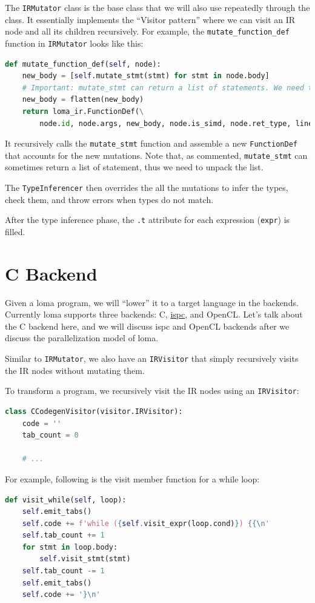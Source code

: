 The \lstinline{IRMutator} class is the base class that we will also use repeatedly through the class. It essentially implements the ``Visitor pattern'' where we can visit an IR node and all its children recursively. For example, the \lstinline{mutate_function_def} function in \lstinline{IRMutator} looks like this:
\begin{lstlisting}[language=Python]
def mutate_function_def(self, node):
    new_body = [self.mutate_stmt(stmt) for stmt in node.body]
    # Important: mutate_stmt can return a list of statements. We need to flatten the list.
    new_body = flatten(new_body)
    return loma_ir.FunctionDef(\
        node.id, node.args, new_body, node.is_simd, node.ret_type, lineno = node.lineno)
\end{lstlisting}
It recursively calls the \lstinline{mutate_stmt} function and assemble a new \lstinline{FunctionDef} that accounts for the new mutations. Note that, as commented, \lstinline{mutate_stmt} can sometimes return a list of statement, thus we need to unpack the list.

The \lstinline{TypeInferencer} then overrides the all the mutations to infer the types, check them, and throw errors when types do not match.

After the type inference phase, the \lstinline{.t} attribute for each expression (\lstinline{expr}) is filled.

\section{C Backend}

Given a loma program, we will ``lower'' it to a target language in the backends. Currently loma supports three backends: C, \href{https://ispc.github.io/index.html}{ispc}, and OpenCL. Let's talk about the C backend here, and we will discuss ispc and OpenCL backends after we discuss the parallelization model of loma.

Similar to \lstinline{IRMutator}, we also have an \lstinline{IRVisitor} that simply recursively visits the IR nodes without mutating them.

To transform a program, we recursively visit the IR nodes using an \lstinline{IRVisitor}:
\begin{lstlisting}[language=python]
class CCodegenVisitor(visitor.IRVisitor):
    code = ''
    tab_count = 0

    # ...
\end{lstlisting}

For example, following is the visit member function for a while loop:
\begin{lstlisting}[language=python]
def visit_while(self, loop):
    self.emit_tabs()
    self.code += f'while ({self.visit_expr(loop.cond)}) {{\n'
    self.tab_count += 1
    for stmt in loop.body:
        self.visit_stmt(stmt)
    self.tab_count -= 1
    self.emit_tabs()
    self.code += '}\n'
\end{lstlisting}

